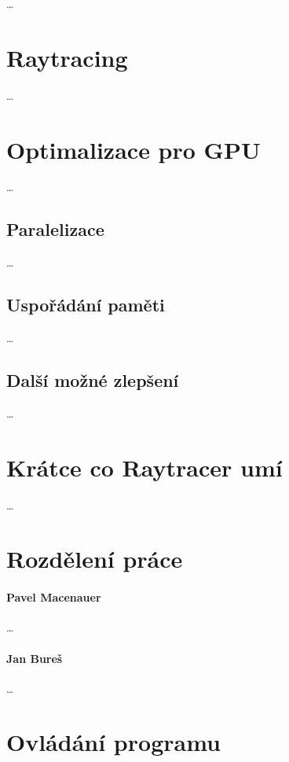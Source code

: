 \documentclass[12pt,a4paper,titlepage,final]{report}
\begin{document}
\dots

\section{Raytracing}

\dots

\section{Optimalizace pro GPU}

\dots

\subsection{Paralelizace}

\dots

\subsection{Uspořádání paměti}

\dots

\subsection{Další možné zlepšení}

\dots

\section{Krátce co Raytracer umí}

\dots

\section{Rozdělení práce}

\paragraph{Pavel Macenauer} \dots

\paragraph{Jan Bureš} \dots

\section{Ovládání programu}
\end{document}
